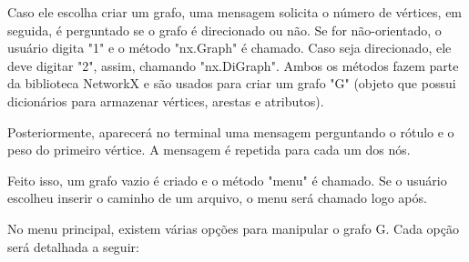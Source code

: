 \documentclass[12pt]{article}
\begin{document}
Caso ele escolha criar um grafo, uma mensagem solicita o número de vértices, em seguida, é perguntado se o grafo é direcionado ou não. Se for não-orientado, o usuário digita "1" e o método "nx.Graph" é chamado. Caso seja direcionado, ele deve digitar "2", assim, chamando "nx.DiGraph". Ambos os métodos fazem parte da biblioteca NetworkX e são usados para criar um grafo "G" (objeto que possui dicionários para armazenar vértices, arestas e atributos).

Posteriormente, aparecerá no terminal uma mensagem perguntando o rótulo e o peso do primeiro vértice. A mensagem é repetida para cada um dos nós.

Feito isso, um grafo vazio é criado e o método "menu" é chamado. Se o usuário escolheu inserir o caminho de um arquivo, o menu será chamado logo após.

No menu principal, existem várias opções para manipular o grafo G. Cada opção será detalhada a seguir:
\end{document}
